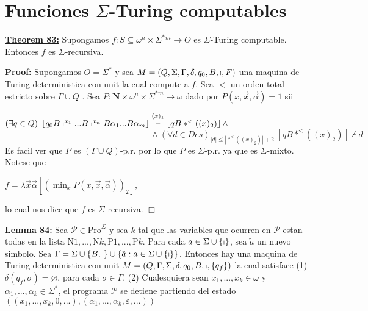 \section{Funciones $\Sigma$-Turing computables}

\textbf{\underline{Theorem 83:}} Supongamos \(f:S\subseteq \omega ^{n}\times \Sigma ^{\ast }{}^{m}\rightarrow O \) es \(\Sigma \)-Turing computable. Entonces \(f\) es \(\Sigma \)-recursiva.

\textbf{\underline{Proof:}} Supongamos \(O=\Sigma ^{\ast }\) y sea \(M=\left( Q,\Sigma ,\Gamma ,\delta ,q_{0},B,\shortmid ,F\right) \) una maquina de Turing deterministica con unit la cual compute a \(f\). Sea \(< \) un orden total estricto sobre \(\Gamma \cup Q\) . Sea \(P:\mathbf{N}\times \omega ^{n}\times \Sigma ^{\ast m}\rightarrow \omega \) dado por \(P(x,\vec{x},\vec{\alpha})=1\) sii

\((\exists q\in Q)\;\left\lfloor q_{0}B\shortmid ^{x_{1}}...B\shortmid ^{x_{n}}B\alpha _{1}...B\alpha _{m}\right\rfloor \overset{(x)_{1}}{\vdash } \left\lfloor qB\ast ^{< }((x)_{2})\right\rfloor \wedge \)
\(\ \ \ \ \ \ \ \ \ \ \ \ \ \ \ \ \ \ \ \ \ \ \ \ \ \ \ \ \ \ \ \ \ \ \ \ \ \ \ \ \ \ \ \ \ \ \ \ \ \ \ \ \ \ \ \ \ \ \ \ \ \ \ \ \ \ \ \ \ \ \ \ \ \ \ \ \ \wedge (\forall d\in Des)_{\left\vert d\right\vert \leq \left\vert \ast ^{< }((x)_{2})\right\vert +2}\;\left\lfloor qB\ast ^{< }((x)_{2})\right\rfloor \nvdash d\)
Es facil ver que \(P\) es \((\Gamma \cup Q)\)-p.r. por lo que \(P\) es \( \Sigma \)-p.r. ya que es \(\Sigma \)-mixto. Notese que

\(\displaystyle f=\lambda \vec{x}\vec{\alpha}\left[ \left( \min_{x}P(x,\vec{x},\vec{\alpha} )\right) _{2}\right] \text{,} \)

lo cual nos dice que \(f\) es \(\Sigma \)-recursiva. \(\Box\)


\textbf{\underline{Lemma 84:}} Sea \(\mathcal{P}\in \mathrm{Pro}^{\Sigma }\) y sea \(k\) tal que las variables que ocurren en \(\mathcal{P}\) estan todas en la lista \(\mathrm{N}1,..., \mathrm{N}\bar{k},\mathrm{P}1,...,\mathrm{P}\bar{k}.\) Para cada \(a\in \Sigma \cup \{\shortmid \}\), sea \(\tilde{a}\) un nuevo simbolo. Sea \(\Gamma =\Sigma \cup \{B,\shortmid \}\cup \{\tilde{a}:a\in \Sigma \cup \{\shortmid \}\}\). Entonces hay una maquina de Turing deterministica con unit \(M=\left( Q,\Gamma ,\Sigma ,\delta ,q_{0},B,\shortmid ,\{q_{f}\}\right) \) la cual satisface
(1) \(\delta (q_{f},\sigma )=\varnothing \), para cada \(\sigma \in \Gamma \).
(2) Cualesquiera sean \(x_{1},...,x_{k}\in \omega \) y \(\alpha _{1},...,\alpha _{k}\in \Sigma ^{\ast }\), el programa \(\mathcal{P}\) se detiene partiendo del estado
\(\displaystyle \left( (x_{1},...,x_{k},0,...),(\alpha _{1},...,\alpha _{k},\varepsilon ,...)\right) \)


